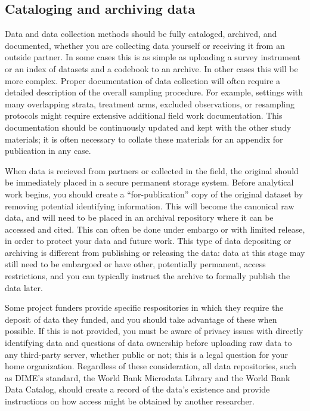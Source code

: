 \subsection{Cataloging and archiving data}

Data and data collection methods should be fully cataloged, archived, and documented,
whether you are collecting data yourself or receiving it from an outside partner.
In some cases this is as simple as uploading
a survey instrument or an index of datasets and a codebook to an archive.
In other cases this will be more complex.
Proper documentation of data collection will often require
a detailed description of the overall sampling procedure.
For example, settings with many overlapping strata,
treatment arms, excluded observations, or resampling protocols
might require extensive additional field work documentation.
This documentation should be continuously updated
and kept with the other study materials;
it is often necessary to collate these materials
for an appendix for publication in any case.

When data is recieved from partners or collected in the field,
the original should be immediately placed in a secure permanent storage system.
Before analytical work begins, you should create a ``for-publication''
copy of the original dataset by removing potential identifying information.
This will become the canonical raw data, and will need to be
placed in an archival repository where it can be accessed and cited.\cite{vilhuber2020report}
This can often be done under embargo or with limited release,
in order to protect your data and future work.
This type of data depositing or archiving
is different from publishing or releasing the data:
data at this stage may still need to be embargoed
or have other, potentially permanent, access restrictions,
and you can typically instruct the archive to formally publish the data later.

Some project funders
provide specific respositories in which they require the deposit of data they funded,
and you should take advantage of these when possible.
If this is not provided, you must be aware of privacy issues
with directly identifying data and questions of data ownership
before uploading raw data to any third-party server, whether public or not;
this is a legal question for your home organization.
Regardless of these consideration, all data repositories,
such as DIME's standard, the World Bank Microdata Library
and the World Bank Data Catalog,
should create a record of the data's existence
and provide instructions on how access might be obtained by another researcher.


